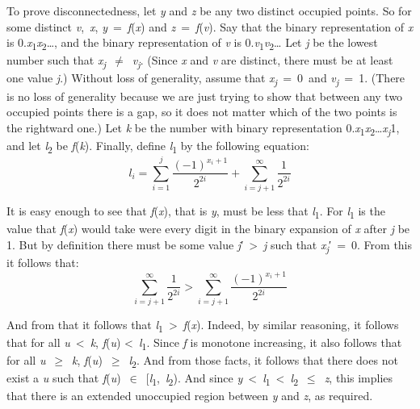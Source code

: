 \documentclass[
  10pt,
  letterpaper,
  DIV=11,
  numbers=noendperiod,
  twoside]{scrartcl}
\begin{document}
To prove disconnectedness, let \emph{y} and \emph{z} be any two distinct
occupied points. So for some distinct \emph{v},~\emph{x},
\emph{y}~=~\emph{f}(\emph{x}) and \emph{z}~=~\emph{f}(\emph{v}). Say
that the binary representation of \emph{x} is
0.\emph{x}\textsubscript{1}\emph{x}\textsubscript{2}\ldots, and the
binary representation of \emph{v} is
0.\emph{v}\textsubscript{1}\emph{v}\textsubscript{2}\ldots{} Let
\emph{j} be the lowest number such that
\emph{x\textsubscript{j}}~\({\neq}\)~\emph{v\textsubscript{j}}. (Since
\emph{x} and \emph{v} are distinct, there must be at least one value
\emph{j}.) Without loss of generality, assume that
\emph{x\textsubscript{j}}~=~0~and \emph{v\textsubscript{j}}~=~1. (There
is no loss of generality because we are just trying to show that between
any two occupied points there is a gap, so it does not matter which of
the two points is the rightward one.) Let \emph{k} be the number with
binary representation
0.\emph{x}\textsubscript{1}\emph{x}\textsubscript{2}\ldots{}\emph{x\textsubscript{j}}1,
and let \emph{l}\textsubscript{2} be \emph{f}(\emph{k}). Finally, define
\emph{l}\textsubscript{1} by the following equation:
\[l_i = \sum_{i=1}^j \frac{(-1)^{x_i+1}}{2^{2i}} + \sum_{i = j+1}^\infty \frac{1}{2^{2i}}\]

It is easy enough to see that \emph{f}(\emph{x}), that is \emph{y}, must
be less that \emph{l}\textsubscript{1}. For \emph{l}\textsubscript{1} is
the value that \emph{f}(\emph{x}) would take were every digit in the
binary expansion of \emph{x} after \emph{j} be 1. But by definition
there must be some value \emph{j}′~\textgreater~\emph{j} such that
\emph{x\textsubscript{j}}′~=~0. From this it follows that:
\[\sum_{i = j+1}^\infty \frac{1}{2^{2i}} > \sum_{i = j+1}^\infty \frac{(-1)^{x_i+1}}{2^{2i}}\]

And from that it follows that
\emph{l}\textsubscript{1}~\textgreater~\emph{f}(\emph{x}). Indeed, by
similar reasoning, it follows that for all \emph{u}~\textless~\emph{k},
\emph{f}(\emph{u}) \textless~\emph{l}\textsubscript{1}. Since \emph{f}
is monotone increasing, it also follows that for all
\emph{u}~\({\geq}\)~\emph{k},
\emph{f}(\emph{u})~\({\geq}\)~\emph{l}\textsubscript{2}. And from those
facts, it follows that there does not exist a \emph{u} such that
\emph{f}(\emph{u})~\({\in}\)~{[}\emph{l}\textsubscript{1},~\emph{l}\textsubscript{2}).
And since
\emph{y}~\textless~\emph{l}\textsubscript{1}~\textless~\emph{l}\textsubscript{2}~\({\leq}\)~\emph{z},
this implies that there is an extended unoccupied region between
\emph{y} and \emph{z}, as required.
\end{document}
